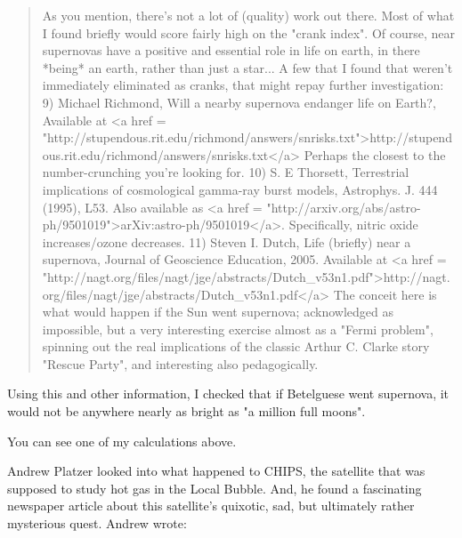 \begin{quote}
  As you mention, there's not a lot of (quality) work out there.  Most of
  what I found briefly would score fairly high on the "crank index".
  Of course, near supernovas have a positive and essential role in life on
  earth, in there *being* an earth, rather than just a star...
  A few that I found that weren't immediately eliminated as cranks, that
  might repay further investigation:
  9) Michael Richmond, Will a nearby supernova endanger life on Earth?,
  Available at <a href = "http://stupendous.rit.edu/richmond/answers/snrisks.txt">http://stupendous.rit.edu/richmond/answers/snrisks.txt</a>
  Perhaps the closest to the number-crunching you're looking for.
  10) S. E Thorsett, Terrestrial implications of cosmological gamma-ray 
  burst models, Astrophys. J. 444 (1995), L53.
  Also available as <a href = "http://arxiv.org/abs/astro-ph/9501019">arXiv:astro-ph/9501019</a>.
  Specifically, nitric oxide increases/ozone decreases.
  11) Steven I. Dutch, Life (briefly) near a supernova, Journal
  of Geoscience Education, 2005.  Available at 
  <a href = "http://nagt.org/files/nagt/jge/abstracts/Dutch_v53n1.pdf">http://nagt.org/files/nagt/jge/abstracts/Dutch_v53n1.pdf</a>
  The conceit here is what would happen if the Sun went supernova; 
  acknowledged as impossible, but a very interesting exercise almost 
  as a "Fermi problem", spinning out the real implications of the 
  classic Arthur C. Clarke story "Rescue Party", and interesting also 
  pedagogically.
\end{quote}

Using this and other information, I checked that if Betelguese went
supernova, it would not be anywhere nearly as bright as "a
million full moons".

You can see one of my calculations above.

Andrew Platzer looked into what happened to CHIPS, the satellite that
was supposed to study hot gas in the Local Bubble.  And, he found a
fascinating newspaper article about this satellite's quixotic, sad, 
but ultimately rather mysterious quest.  Andrew wrote:

